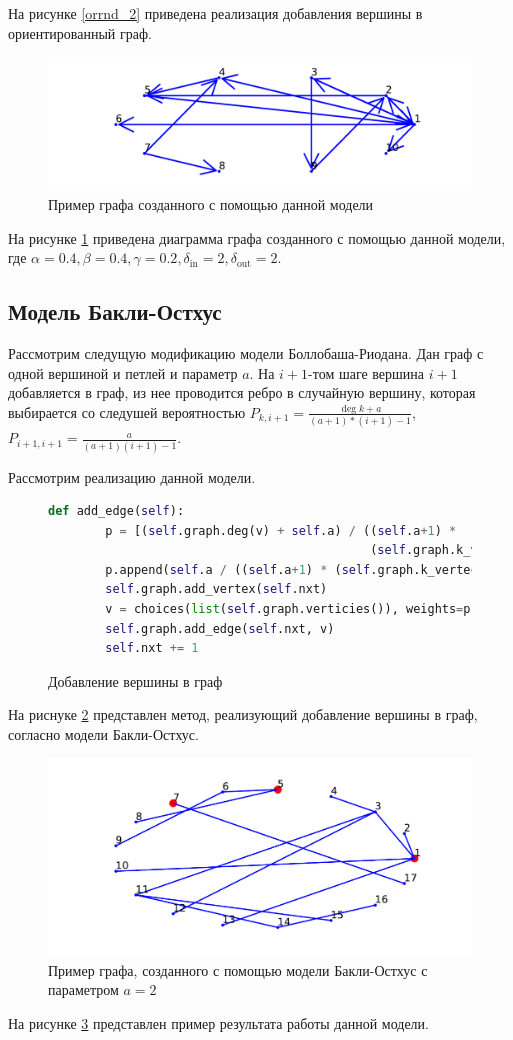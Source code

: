 На рисунке \ref{orrnd_2} приведена реализация добавления вершины 
в ориентированный граф.
\begin{figure}[H] 
    \includegraphics{or1.pdf} 
    \caption{Пример графа созданного с помощью данной модели}
    \label{orrnd_3}
\end{figure} 
На рисунке \ref{orrnd_3} приведена диаграмма графа созданного с помощью данной модели,
где $\alpha = 0.4,\beta = 0.4,\gamma =0.2, \delta_{\text{in}} = 2, \delta_{\text{out}} = 2$.
\subsection{Модель Бакли-Остхус}
Рассмотрим следущую \cite{buck} модификацию модели Боллобаша-Риодана. 
Дан граф с одной вершиной и петлей и параметр $a$. 
На  $i+1$-том шаге  вершина $i+1$ добавляется в граф, из нее 
проводится ребро в случайную вершину, которая выбирается со следушей вероятностью $P_{k,i+1} = \frac{\deg{k} + a }{(a+1)*(i+1) - 1}$,
$P_{i+1,i+1} = \frac{a}{(a+1)(i+1) - 1}$.

Рассмотрим реализацию данной модели.
\begin{figure}[H] 
\begin{lstlisting}[language=Python] 
    def add_edge(self):
        p = [(self.graph.deg(v) + self.a) / ((self.a+1) *
                                             (self.graph.k_vertecies() + 1) - 1) for v in self.graph.verticies()]
        p.append(self.a / ((self.a+1) * (self.graph.k_vertecies() + 1)-1))
        self.graph.add_vertex(self.nxt)
        v = choices(list(self.graph.verticies()), weights=p, k=1)[0]
        self.graph.add_edge(self.nxt, v)
        self.nxt += 1
\end{lstlisting}  
    \caption{Добавление вершины в граф}
    \label{os_1}
\end{figure} 
На риснуке \ref{os_1} представлен метод, реализующий добавление 
вершины в граф, согласно модели Бакли-Остхус.
\begin{figure}[H] 
    \includegraphics[scale=0.8]{os.pdf} 
    \caption{Пример графа, созданного с помощью модели Бакли-Остхус с параметром $a=2$}
    \label{os_2}
\end{figure} 
На рисунке \ref{os_2} представлен пример результата работы данной модели.
